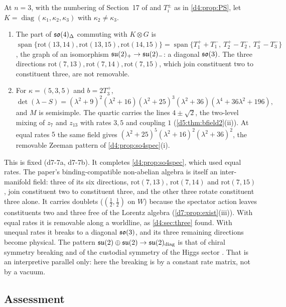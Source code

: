 \begin{proposition}
\label{d7:prop:so4unequal}
At $n=3$, with the numbering of Section~17 of \cite{ES17} and $T^\pm_i$ as in \cref{d4:prop:PS}, let $K=\operatorname{diag}(\kappa_1,\kappa_2,\kappa_3)$ with
$\kappa_2\neq\kappa_3$.
\begin{enumerate}[label=(\roman*),leftmargin=2.2em]
\item The part of $\mathfrak{so}(4)_\Delta$ commuting with $K\otimes G$ is $\operatorname{span}\{\mathrm{rot}(13,14),\mathrm{rot}(13,15),\mathrm{rot}(14,15)\}
=\operatorname{span}\{T^+_1+T^-_1,\ T^+_2-T^-_2,\ T^+_3-T^-_3\}$, the graph of an isomorphism $\mathfrak{su}(2)_+\to\mathfrak{su}(2)_-$: a diagonal $\mathfrak{so}(3)$. The three directions
$\mathrm{rot}(7,13),\mathrm{rot}(7,14),\mathrm{rot}(7,15)$, which join constituent two to constituent three, are not removable.
\item For $\kappa=(5,3,5)$ and $b=2T^+_3$,
\[
\det(\lambda-S)=(\lambda^2+9)^2(\lambda^2+16)(\lambda^2+25)^3(\lambda^2+36)(\lambda^4+36\lambda^2+196),
\]
and $M$ is semisimple. The quartic carries the lines $4\pm\sqrt2$, the two-level mixing of $z_7$ and $z_{13}$ with rates $3,5$ and coupling $1$
(\cref{d5:thm:bfield2}(ii)). At equal rates $5$ the same field gives $(\lambda^2+25)^5(\lambda^2+16)^2(\lambda^2+36)^2$, the removable Zeeman pattern
of \cref{d4:prop:so4spec}(i).
\end{enumerate}
\end{proposition}

This is fixed (d7-7a, d7-7b). It completes \cref{d4:prop:so4spec}, which used equal rates. The paper's binding-compatible non-abelian algebra is
itself an inter-manifold field: three of its six directions, $\mathrm{rot}(7,13)$, $\mathrm{rot}(7,14)$ and $\mathrm{rot}(7,15)$, join constituent two to constituent three, and the other three rotate constituent three alone. It carries doublets ($(\tfrac12,\tfrac12)$ on
$W$) because the spectator action leaves constituents two and three free of the Lorentz algebra (\cref{d7:prop:exist}(iii)). With equal rates it is
removable along a worldline, as \cref{d4:sec:three} found. With unequal rates it breaks to a diagonal $\mathfrak{so}(3)$, and its three remaining directions
become physical. The pattern $\mathfrak{su}(2)\oplus\mathfrak{su}(2)\to\mathfrak{su}(2)_{\rm diag}$ is that of chiral symmetry breaking and of the custodial symmetry of the Higgs
sector \cite{SikivieEtAl80}. That is an interpretive parallel only: here the breaking is by a constant rate matrix, not by a vacuum.

\subsection{Assessment}
\label{d7:sec:assess}

